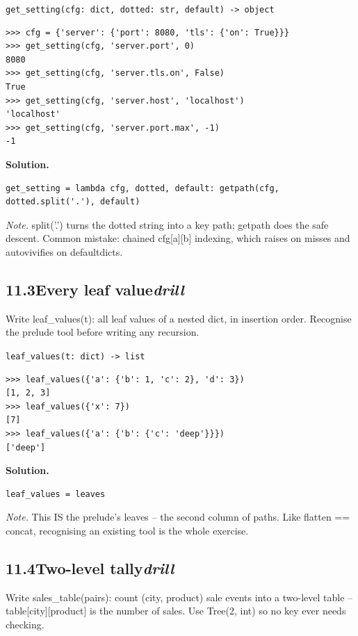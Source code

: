 \documentclass[10pt,letterpaper]{book}
\begin{document}
\noindent\texttt{get\_setting(cfg: dict, dotted: str, default) -> object}
\begin{lstlisting}[style=ex]
>>> cfg = {'server': {'port': 8080, 'tls': {'on': True}}}
>>> get_setting(cfg, 'server.port', 0)
8080
>>> get_setting(cfg, 'server.tls.on', False)
True
>>> get_setting(cfg, 'server.host', 'localhost')
'localhost'
>>> get_setting(cfg, 'server.port.max', -1)
-1
\end{lstlisting}
\noindent\textbf{Solution.}
\begin{lstlisting}[style=code]
get_setting = lambda cfg, dotted, default: getpath(cfg, dotted.split('.'), default)
\end{lstlisting}
\noindent\textit{Note.} split('.') turns the dotted string into a key path; getpath does the safe descent. Common mistake: chained cfg[a][b] indexing, which raises on misses and autovivifies on defaultdicts.


\subsection*{11.3\quad Every leaf value\hfill\textnormal{\textit{drill}}}
Write leaf\_values(t): all leaf values of a nested dict, in insertion order. Recognise the prelude tool before writing any recursion.

\noindent\texttt{leaf\_values(t: dict) -> list}
\begin{lstlisting}[style=ex]
>>> leaf_values({'a': {'b': 1, 'c': 2}, 'd': 3})
[1, 2, 3]
>>> leaf_values({'x': 7})
[7]
>>> leaf_values({'a': {'b': {'c': 'deep'}}})
['deep']
\end{lstlisting}
\noindent\textbf{Solution.}
\begin{lstlisting}[style=code]
leaf_values = leaves
\end{lstlisting}
\noindent\textit{Note.} This IS the prelude's leaves -- the second column of paths. Like flatten == concat, recognising an existing tool is the whole exercise.

\subsection*{11.4\quad Two-level tally\hfill\textnormal{\textit{drill}}}
Write sales\_table(pairs): count (city, product) sale events into a two-level table -- table[city][product] is the number of sales. Use Tree(2, int) so no key ever needs checking.
\end{document}
